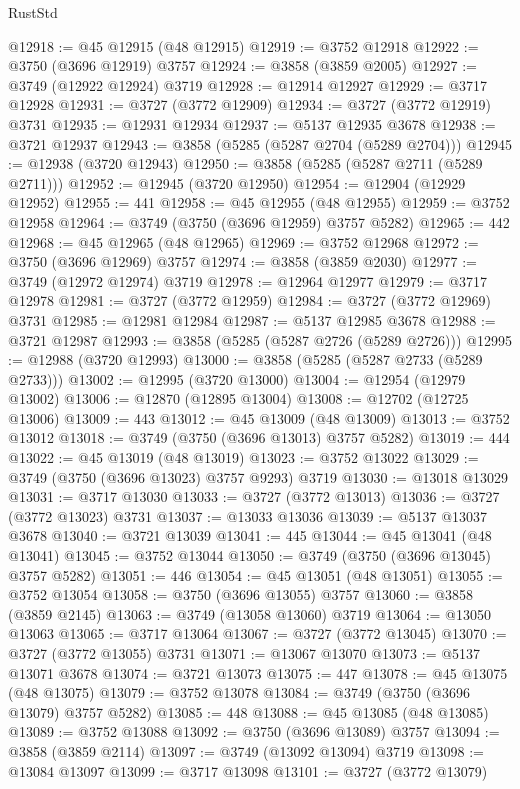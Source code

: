 \begin{lexlean}{RustStd}
\begin{coremodule}
@12918 := @45 @12915 (@48 @12915)
@12919 := @3752 @12918
@12922 := @3750 (@3696 @12919) @3757
@12924 := @3858 (@3859 @2005)
@12927 := @3749 (@12922 @12924) @3719
@12928 := @12914 @12927
@12929 := @3717 @12928
@12931 := @3727 (@3772 @12909)
@12934 := @3727 (@3772 @12919) @3731
@12935 := @12931 @12934
@12937 := @5137 @12935 @3678
@12938 := @3721 @12937
@12943 := @3858 (@5285 (@5287 @2704 (@5289 @2704)))
@12945 := @12938 (@3720 @12943)
@12950 := @3858 (@5285 (@5287 @2711 (@5289 @2711)))
@12952 := @12945 (@3720 @12950)
@12954 := @12904 (@12929 @12952)
@12955 := 441
@12958 := @45 @12955 (@48 @12955)
@12959 := @3752 @12958
@12964 := @3749 (@3750 (@3696 @12959) @3757 @5282)
@12965 := 442
@12968 := @45 @12965 (@48 @12965)
@12969 := @3752 @12968
@12972 := @3750 (@3696 @12969) @3757
@12974 := @3858 (@3859 @2030)
@12977 := @3749 (@12972 @12974) @3719
@12978 := @12964 @12977
@12979 := @3717 @12978
@12981 := @3727 (@3772 @12959)
@12984 := @3727 (@3772 @12969) @3731
@12985 := @12981 @12984
@12987 := @5137 @12985 @3678
@12988 := @3721 @12987
@12993 := @3858 (@5285 (@5287 @2726 (@5289 @2726)))
@12995 := @12988 (@3720 @12993)
@13000 := @3858 (@5285 (@5287 @2733 (@5289 @2733)))
@13002 := @12995 (@3720 @13000)
@13004 := @12954 (@12979 @13002)
@13006 := @12870 (@12895 @13004)
@13008 := @12702 (@12725 @13006)
@13009 := 443
@13012 := @45 @13009 (@48 @13009)
@13013 := @3752 @13012
@13018 := @3749 (@3750 (@3696 @13013) @3757 @5282)
@13019 := 444
@13022 := @45 @13019 (@48 @13019)
@13023 := @3752 @13022
@13029 := @3749 (@3750 (@3696 @13023) @3757 @9293) @3719
@13030 := @13018 @13029
@13031 := @3717 @13030
@13033 := @3727 (@3772 @13013)
@13036 := @3727 (@3772 @13023) @3731
@13037 := @13033 @13036
@13039 := @5137 @13037 @3678
@13040 := @3721 @13039
@13041 := 445
@13044 := @45 @13041 (@48 @13041)
@13045 := @3752 @13044
@13050 := @3749 (@3750 (@3696 @13045) @3757 @5282)
@13051 := 446
@13054 := @45 @13051 (@48 @13051)
@13055 := @3752 @13054
@13058 := @3750 (@3696 @13055) @3757
@13060 := @3858 (@3859 @2145)
@13063 := @3749 (@13058 @13060) @3719
@13064 := @13050 @13063
@13065 := @3717 @13064
@13067 := @3727 (@3772 @13045)
@13070 := @3727 (@3772 @13055) @3731
@13071 := @13067 @13070
@13073 := @5137 @13071 @3678
@13074 := @3721 @13073
@13075 := 447
@13078 := @45 @13075 (@48 @13075)
@13079 := @3752 @13078
@13084 := @3749 (@3750 (@3696 @13079) @3757 @5282)
@13085 := 448
@13088 := @45 @13085 (@48 @13085)
@13089 := @3752 @13088
@13092 := @3750 (@3696 @13089) @3757
@13094 := @3858 (@3859 @2114)
@13097 := @3749 (@13092 @13094) @3719
@13098 := @13084 @13097
@13099 := @3717 @13098
@13101 := @3727 (@3772 @13079)

\end{coremodule}
\end{lexlean}
